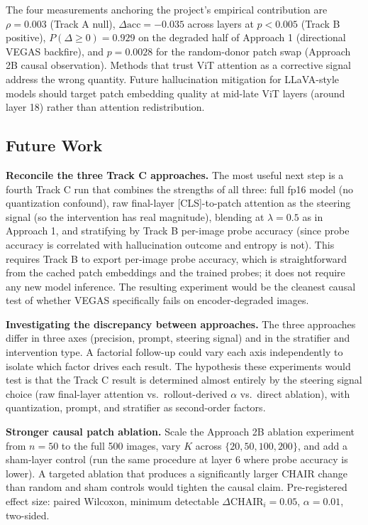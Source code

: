 \documentclass[11pt]{article}
\begin{document}
The four measurements anchoring the project's empirical contribution are
$\rho = 0.003$ (Track A null), $\Delta\mathrm{acc} = -0.035$ across layers at
$p < 0.005$ (Track B positive), $P(\Delta \geq 0) = 0.929$ on the degraded half of
Approach 1 (directional VEGAS backfire), and $p = 0.0028$ for the random-donor patch
swap (Approach 2B causal observation). Methods that trust ViT attention as a
corrective signal address the wrong quantity. Future hallucination mitigation for
LLaVA-style models should target patch embedding quality at mid-late ViT layers (around
layer 18) rather than attention redistribution.

\subsection{Future Work}

\textbf{Reconcile the three Track C approaches.} The most useful next step is a fourth
Track C run that combines the strengths of all three: full fp16 model (no quantization
confound), raw final-layer [CLS]-to-patch attention as the steering signal (so the
intervention has real magnitude), blending at $\lambda = 0.5$ as in Approach 1, and
stratifying by Track B per-image probe accuracy (since probe accuracy is correlated with
hallucination outcome and entropy is not). This requires Track B to export per-image
probe accuracy, which is straightforward from the cached patch embeddings and the
trained probes; it does not require any new model inference. The resulting experiment
would be the cleanest causal test of whether VEGAS specifically fails on encoder-degraded
images.

\textbf{Investigating the discrepancy between approaches.} The three approaches differ
in three axes (precision, prompt, steering signal) and in the stratifier and
intervention type. A factorial follow-up could vary each axis independently to isolate
which factor drives each result. The hypothesis these experiments would test is that
the Track C result is determined almost entirely by the steering signal choice (raw
final-layer attention vs.\ rollout-derived $\alpha$ vs.\ direct ablation), with
quantization, prompt, and stratifier as second-order factors.

\textbf{Stronger causal patch ablation.} Scale the Approach 2B ablation experiment from
$n = 50$ to the full 500 images, vary $K$ across $\{20, 50, 100, 200\}$, and add a
sham-layer control (run the same procedure at layer 6 where probe accuracy is lower).
A targeted ablation that produces a significantly larger CHAIR change than random and
sham controls would tighten the causal claim. Pre-registered effect size: paired
Wilcoxon, minimum detectable $\Delta\mathrm{CHAIR}_i = 0.05$, $\alpha = 0.01$,
two-sided.
\end{document}
